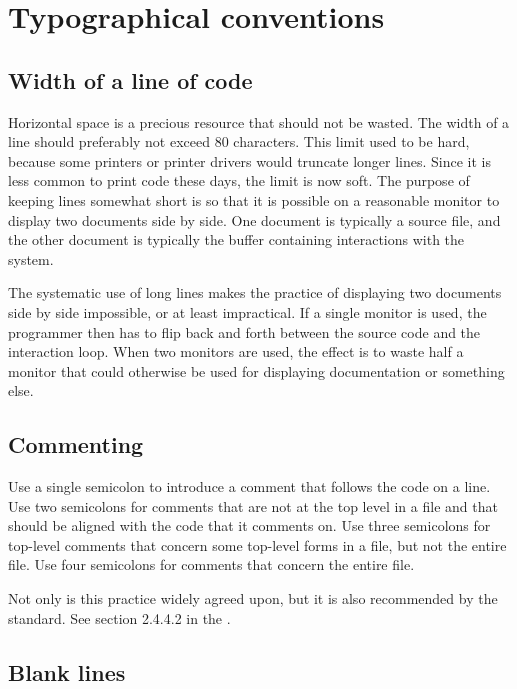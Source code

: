 \chapter{Typographical conventions}

\section{Width of a line of code}

Horizontal space is a precious resource that should not be wasted.
The width of a line should preferably not exceed 80 characters.  This
limit used to be hard, because some printers or printer drivers would
truncate longer lines.  Since it is less common to print code these
days, the limit is now soft.  The purpose of keeping lines somewhat
short is so that it is possible on a reasonable monitor to display two
documents side by side.  One document is typically a \commonlisp{}
source file, and the other document is typically the buffer containing
interactions with the \commonlisp{} system.

The systematic use of long lines makes the practice of displaying two
documents side by side impossible, or at least impractical.  If a
single monitor is used, the programmer then has to flip back and forth
between the source code and the interaction loop.  When two monitors
are used, the effect is to waste half a monitor that could otherwise
be used for displaying documentation or something else.

\section{Commenting}

Use a single semicolon to introduce a comment that follows the code on
a line.  Use two semicolons for comments that are not at the top level
in a file and that should be aligned with the code that it comments
on.  Use three semicolons for top-level comments that concern some
top-level forms in a file, but not the entire file.  Use four
semicolons for comments that concern the entire file.

Not only is this practice widely agreed upon, but it is also
recommended by the standard.  See section 2.4.4.2 in the \commonlisp{}
\hs{}.

\section{Blank lines}

